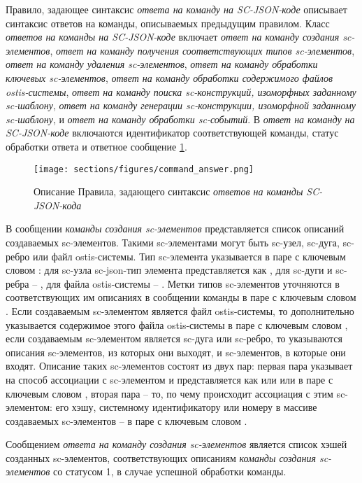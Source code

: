 Правило, задающее синтаксис \textit{ответа на команду на SC-JSON-коде} описывает синтаксис ответов на команды, описываемых предыдущим правилом. Класс \textit{ответов на команды на SC-JSON-коде} включает \textit{ответ на команду создания sc-элементов}, \textit{ответ на команду получения соответствующих типов sc-элементов}, \textit{ответ на команду удаления sc-элементов}, \textit{ответ на команду обработки ключевых sc-элементов}, \textit{ответ на команду обработки содержимого файлов ostis-системы}, \textit{ответ на команду поиска sc-конструкций, изоморфных заданному sc-шаблону}, \textit{ответ на команду генерации sc-конструкции, изоморфной заданному sc-шаблону}, и \textit{ответ на команду обработки sc-событий}. В \textit{ответ на команду на SC-JSON-коде} включаются идентификатор соответствующей команды, статус обработки ответа и ответное сообщение \ref{fig:command_answer}.

\begin{figure}[htbp]
  \center
  \texttt{[image: sections/figures/command\_answer.png]}
  \caption{Описание Правила, задающего синтаксис \textit{ответов на команды SC-JSON-кода}}
  \label{fig:command_answer}
\end{figure}

В сообщении \textit{команды создания sc-элементов} представляется список описаний создаваемых sc-элементов. Такими sc-элементами могут быть sc-узел, sc-дуга, sc-ребро или файл ostis-системы. Тип sc-элемента указывается в паре с ключевым словом : для sc-узла sc-json-тип элемента представляется как , для sc-дуги и sc-ребра -- , для файла ostis-системы -- . Метки типов sc-элементов уточняются в соответствующих им описаниях в сообщении команды в паре с ключевым словом . Если создаваемым sc-элементом является файл ostis-системы, то дополнительно указывается содержимое этого файла ostis-системы в паре с ключевым словом , если создаваемым sc-элементом является sc-дуга или sc-ребро, то указываются описания sc-элементов, из которых они выходят, и sc-элементов, в которые они входят. Описание таких sc-элементов состоят из двух пар: первая пара указывает на способ ассоциации с sc-элементом и представляется как  или  или  в паре с ключевым словом , вторая пара -- то, по чему происходит ассоциация с этим sc-элементом: его хэшу, системному идентификатору или номеру в массиве создаваемых sc-элементов -- в паре с ключевым словом .

Сообщением \textit{ответа на команду создания sc-элементов} является список хэшей созданных sc-элементов, соответствующих описаниям \textit{команды создания sc-элементов} со статусом 1, в случае успешной обработки команды.

